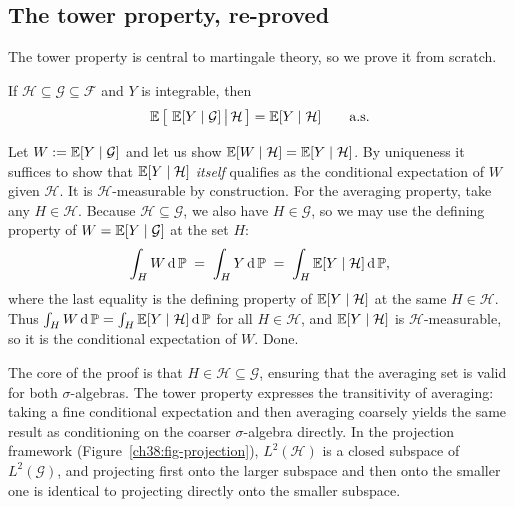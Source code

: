\subsection{The tower property, re-proved}
\label{ch38:tower}

The tower property is central to martingale theory, so we prove it from scratch.

\begin{theorem}
\label{ch38:thm-tower}
If $\mathcal{H} \subseteq \mathcal{G} \subseteq \mathcal{F}$ and $Y$ is integrable, then
\[
  \operatorname{\mathbb{E}}\big[\,\operatorname{\mathbb{E}}[Y\mid\mathcal{G}] \,\big|\, \mathcal{H}\,\big] = \operatorname{\mathbb{E}}[Y\mid\mathcal{H}]
  \qquad \text{a.s.}
\]
\end{theorem}

\begin{whybox}
Let $W := \operatorname{\mathbb{E}}[Y\mid\mathcal{G}]$ and let us show $\operatorname{\mathbb{E}}[W \mid \mathcal{H}] = \operatorname{\mathbb{E}}[Y\mid\mathcal{H}]$.
By uniqueness it suffices to show that $\operatorname{\mathbb{E}}[Y\mid\mathcal{H}]$ \emph{itself} qualifies as the
conditional expectation of $W$ given $\mathcal{H}$. It is $\mathcal{H}$-measurable by construction.
For the averaging property, take any $H \in \mathcal{H}$. Because $\mathcal{H} \subseteq \mathcal{G}$,
we also have $H \in \mathcal{G}$, so we may use the defining property of $W = \operatorname{\mathbb{E}}[Y\mid\mathcal{G}]$
at the set $H$:
\[
  \int_H W \,\mathrm{d}\operatorname{\mathbb{P}} \;=\; \int_H Y \,\mathrm{d}\operatorname{\mathbb{P}} \;=\; \int_H \operatorname{\mathbb{E}}[Y\mid\mathcal{H}] \,\mathrm{d}\operatorname{\mathbb{P}},
\]
where the last equality is the defining property of $\operatorname{\mathbb{E}}[Y\mid\mathcal{H}]$ at the same $H \in
\mathcal{H}$. Thus $\int_H W\,\mathrm{d}\operatorname{\mathbb{P}} = \int_H \operatorname{\mathbb{E}}[Y\mid\mathcal{H}]\,\mathrm{d}\operatorname{\mathbb{P}}$ for all $H \in
\mathcal{H}$, and $\operatorname{\mathbb{E}}[Y\mid\mathcal{H}]$ is $\mathcal{H}$-measurable, so it is the conditional
expectation of $W$. Done.
\end{whybox}

\begin{happeningbox}
The core of the proof is that $H \in \mathcal{H} \subseteq \mathcal{G}$, ensuring
that the averaging set is valid for both $\sigma$-algebras. The tower property
expresses the transitivity of averaging: taking a fine conditional expectation
and then averaging coarsely yields the same result as conditioning on the coarser
$\sigma$-algebra directly. In the projection framework (Figure~\ref{ch38:fig-projection}),
$L^2(\mathcal{H})$ is a closed subspace of $L^2(\mathcal{G})$, and projecting
first onto the larger subspace and then onto the smaller one is identical to
projecting directly onto the smaller subspace.
\end{happeningbox}


